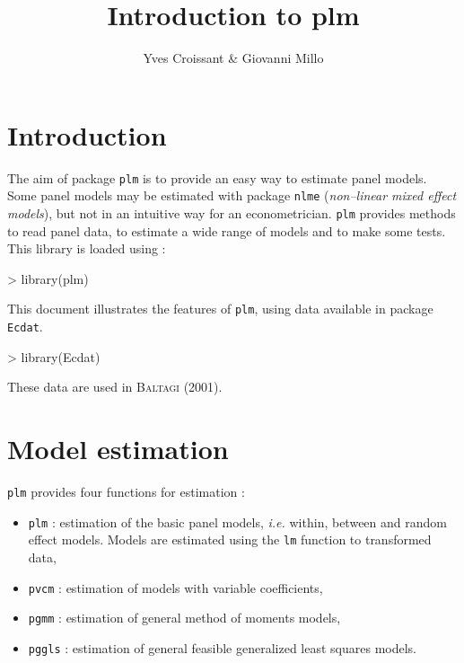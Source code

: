 \documentclass[a4paper]{article}
\title{Introduction to plm}
\author{Yves Croissant \& Giovanni Millo}
\begin{document}
\maketitle


\section{Introduction}

The aim of package \texttt{plm} is to provide an easy way to estimate
panel models. Some panel models may be estimated with package \texttt{nlme}
(\textit{non--linear mixed effect models}), but not in an intuitive
way for an econometrician.
\texttt{plm} provides methods to read panel data, to estimate a wide
range of models and to make some tests. 
This library is loaded using :

\begin{Schunk}
\begin{Sinput}
> library(plm)
\end{Sinput}
\end{Schunk}

This document illustrates the features  of  \texttt{plm}, using
data available in  package \texttt{Ecdat}. 

\begin{Schunk}
\begin{Sinput}
> library(Ecdat)
\end{Sinput}
\end{Schunk}

These data are used in  \textsc{Baltagi} (2001).



\section{Model estimation}

\texttt{plm} provides four functions for estimation :

\begin{itemize}
\item \texttt{plm} : estimation of the
  basic panel models, \emph{i.e.} within, between and random effect
  models. Models are estimated using the \texttt{lm} function to
  transformed data,
\item \texttt{pvcm} : estimation of models with variable coefficients,
\item \texttt{pgmm} : estimation of general method of moments models,
\item \texttt{pggls} : estimation of general feasible generalized least squares
  models.
\end{itemize}
\end{document}
